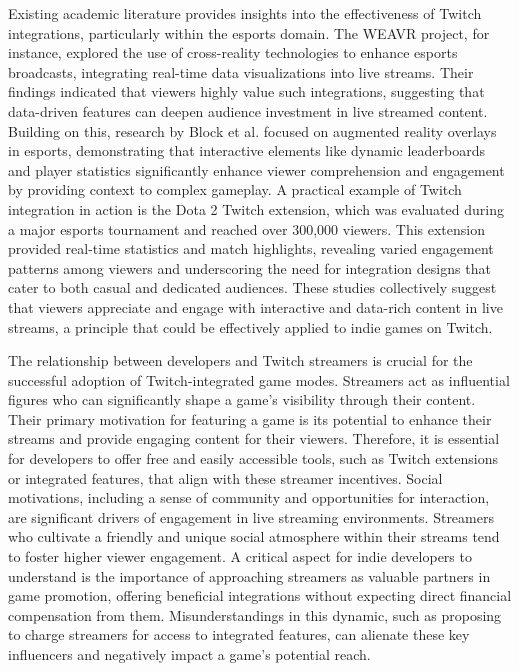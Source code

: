 \documentclass[conference]{IEEEtran}
\begin{document}
Existing academic literature provides insights into the effectiveness of Twitch integrations, particularly within the esports domain. The WEAVR project, for instance, explored the use of cross-reality technologies to enhance esports broadcasts, integrating real-time data visualizations into live streams. Their findings indicated that viewers highly value such integrations, suggesting that data-driven features can deepen audience investment in live streamed content. Building on this, research by Block et al. focused on augmented reality overlays in esports, demonstrating that interactive elements like dynamic leaderboards and player statistics significantly enhance viewer comprehension and engagement by providing context to complex gameplay. A practical example of Twitch integration in action is the Dota 2 Twitch extension, which was evaluated during a major esports tournament and reached over 300,000 viewers. This extension provided real-time statistics and match highlights, revealing varied engagement patterns among viewers and underscoring the need for integration designs that cater to both casual and dedicated audiences. These studies collectively suggest that viewers appreciate and engage with interactive and data-rich content in live streams, a principle that could be effectively applied to indie games on Twitch.

The relationship between developers and Twitch streamers is crucial for the successful adoption of Twitch-integrated game modes. Streamers act as influential figures who can significantly shape a game's visibility through their content. Their primary motivation for featuring a game is its potential to enhance their streams and provide engaging content for their viewers. Therefore, it is essential for developers to offer free and easily accessible tools, such as Twitch extensions or integrated features, that align with these streamer incentives. Social motivations, including a sense of community and opportunities for interaction, are significant drivers of engagement in live streaming environments. Streamers who cultivate a friendly and unique social atmosphere within their streams tend to foster higher viewer engagement. A critical aspect for indie developers to understand is the importance of approaching streamers as valuable partners in game promotion, offering beneficial integrations without expecting direct financial compensation from them. Misunderstandings in this dynamic, such as proposing to charge streamers for access to integrated features, can alienate these key influencers and negatively impact a game's potential reach.
\end{document}
